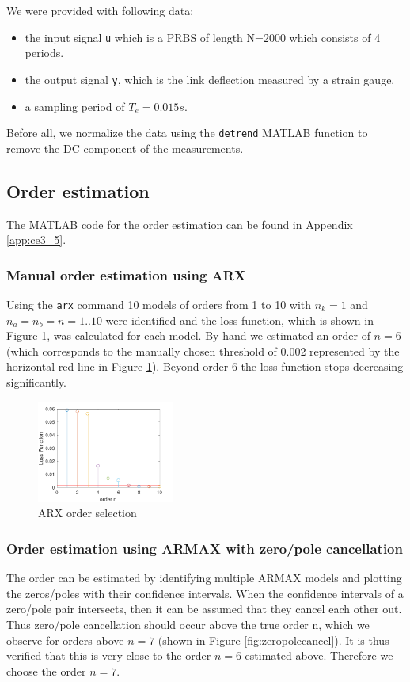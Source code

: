 \documentclass[a4paper,11pt]{article}
\begin{document}
We were provided with following data:
\begin{itemize}
\item the input signal \texttt{u} which is a PRBS of length N=2000 which consists of 4 periods.
\item the output signal \texttt{y}, which is the link deflection measured by a strain gauge.
\item a sampling period of $T_e = 0.015s$.
\end{itemize}

Before all, we normalize the data using the \verb'detrend' MATLAB function to remove the DC component of the measurements.

\subsection{Order estimation}
The MATLAB code for the order estimation can be found in Appendix \ref{app:ce3_5}.

\subsubsection{Manual order estimation using ARX}
Using the \verb'arx' command 10 models of orders from 1 to 10 with $n_k = 1$ and $n_a = n_b = n = 1..10$ were identified and the loss function, which is shown in Figure \ref{fig:arxlossfn}, was calculated for each model. By hand we estimated an order of $n=6$ (which corresponds to the manually chosen threshold of 0.002 represented by the horizontal red line in Figure \ref{fig:arxlossfn}). Beyond order 6 the loss function stops decreasing significantly.

\begin{figure}[H]
\centering
\includegraphics[width=0.4\textwidth]{images/arxordsel}
\caption{ARX order selection}
\label{fig:arxlossfn}
\end{figure}

\subsubsection{Order estimation using ARMAX with zero/pole cancellation}
The order can be estimated by identifying multiple ARMAX models and plotting the zeros/poles with their confidence intervals. When the confidence intervals of a zero/pole pair intersects, then it can be assumed that they cancel each other out. Thus zero/pole cancellation should occur above the true order n, which we observe for orders above $n=7$ (shown in Figure \ref{fig:zeropolecancel}). It is thus verified that this is very close to the order $n=6$ estimated above. Therefore we choose the order $n=7$. 
\end{document}
